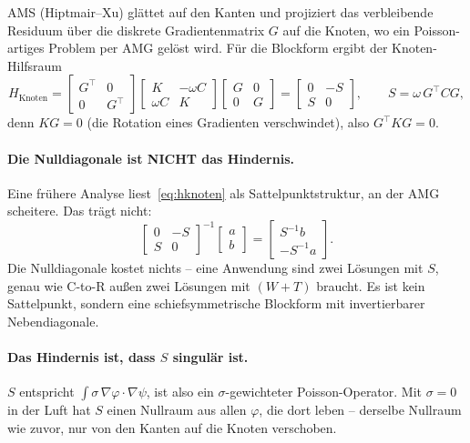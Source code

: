 \documentclass[11pt,a4paper]{article}
\begin{document}
AMS (Hiptmair--Xu) glättet auf den Kanten und projiziert das verbleibende
Residuum über die diskrete Gradientenmatrix $G$ auf die Knoten, wo ein
Poisson-artiges Problem per AMG gelöst wird. Für die Blockform ergibt der
Knoten-Hilfsraum
\begin{equation}
  H_{\text{Knoten}}
  = \begin{bmatrix} G^{\!\top} & 0 \\ 0 & G^{\!\top}\end{bmatrix}
    \begin{bmatrix} K & -\omega C \\ \omega C & K \end{bmatrix}
    \begin{bmatrix} G & 0 \\ 0 & G \end{bmatrix}
  = \begin{bmatrix} 0 & -S \\ S & 0\end{bmatrix},
  \qquad S = \omega\,G^{\!\top}CG,
  \label{eq:hknoten}
\end{equation}
denn $KG = 0$ (die Rotation eines Gradienten verschwindet), also
$G^{\!\top}KG = 0$.

\paragraph{Die Nulldiagonale ist NICHT das Hindernis.} Eine frühere Analyse
liest~\eqref{eq:hknoten} als Sattelpunktstruktur, an der AMG scheitere. Das
trägt nicht:
\begin{equation}
  \begin{bmatrix} 0 & -S \\ S & 0\end{bmatrix}^{-1}
  \begin{bmatrix} a \\ b\end{bmatrix}
  = \begin{bmatrix} S^{-1}b \\ -S^{-1}a\end{bmatrix}.
\end{equation}
Die Nulldiagonale kostet nichts -- eine Anwendung sind zwei Lösungen mit $S$,
genau wie C-to-R außen zwei Lösungen mit $(W{+}T)$ braucht. Es ist kein
Sattelpunkt, sondern eine schiefsymmetrische Blockform mit invertierbarer
Nebendiagonale.

\paragraph{Das Hindernis ist, dass $S$ singulär ist.} $S$ entspricht
$\int \sigma\,\nabla\varphi\cdot\nabla\psi$, ist also ein $\sigma$-gewichteter
Poisson-Operator. Mit $\sigma = 0$ in der Luft hat $S$ einen Nullraum aus
allen $\varphi$, die dort leben -- derselbe Nullraum wie zuvor, nur von den
Kanten auf die Knoten verschoben.
\end{document}
